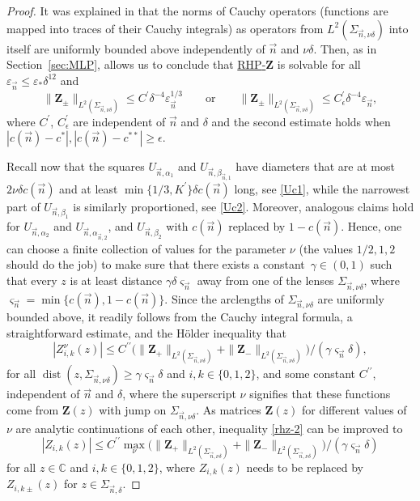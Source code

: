 \documentclass[pdftex]{sigma}
\numberwithin{equation}{section}
\newcommand{\C}		{\mathbb{C}}
\newcommand{\dist}{\operatorname{dist}}
\newcommand{\n}{{\vec n}}
\newcommand{\rhz} {\textnormal{RHP}-${\boldsymbol Z}$}
\begin{document}
\begin{proof}
It was explained in \cite[Lemma~7.9]{ApDenYa21} that the norms of Cauchy operators (functions are mapped into traces of their Cauchy integrals) as operators from $ L^2(\Sigma_{\n,\nu\delta}) $ into itself are uniformly bounded above independently of $ \n $ and $ \nu\delta $. Then, as in Section~\ref{sec:MLP}, \cite[Theorem~8.1]{FokasItsKapaevNovokshenov} allows us to conclude that \hyperref[rhz]{\rhz} is solvable for all $ \varepsilon_\n \leq \varepsilon_*\delta^{12} $ and
\begin{equation}
\label{rhz-4}
\|\boldsymbol Z_\pm\|_{L^2(\Sigma_{\n,\nu\delta})} \leq C^\prime \delta^{-4} \varepsilon_\n^{1/3} \qquad \text{or} \qquad \|\boldsymbol Z_\pm\|_{L^2(\Sigma_{\n,\nu\delta})} \leq C^\prime_\epsilon \delta^{-4}\varepsilon_\n,
\end{equation}
where $ C^\prime$, $C^\prime_\epsilon $ are independent of $ \n $ and $ \delta $ and the second estimate holds when $ |c(\n)-c^\ast|,|c(\n)-c^{\ast\ast}|\geq\epsilon $.

Recall now that the squares $ U_{\n,\alpha_1} $ and $ U_{\n,\beta_{\n,1}} $ have diameters that are at most $ 2\nu\delta c(\n) $ and at least $ \min\{1/3,K^\prime\}\delta c(\n)$ long, see \eqref{Uc1}, while the narrowest part of $ U_{\n,\beta_1} $ is similarly proportioned, see \eqref{Uc2}. Moreover, analogous claims hold for $ U_{\n,\alpha_2} $ and $ U_{\n,\alpha_{\n,2}} $, and $ U_{\n,\beta_2} $ with $ c(\n) $ replaced by $ 1-c(\n) $. Hence, one can choose a finite collection of values for the parameter $ \nu $ (the values $1/2,1,2$ should do the job) to make sure that there exists a constant~$ \gamma\in(0,1)$ such that every $ z $ is at least distance $ \gamma\delta \varsigma_\n $ away from one of the lenses $ \Sigma_{\n,\nu\delta} $, where~$ {\varsigma_\n = \min\{ c(\n),1-c(\n) \} }$. Since the arclengths of $ \Sigma_{\n,\nu\delta} $ are uniformly bounded above, it readily follows from the Cauchy integral formula, a straightforward estimate, and the H\"older inequality that
\begin{equation}
\label{rhz-2}
|Z_{i,k}^\nu(z)| \leq C^{\prime\prime} \bigl( \|\boldsymbol Z_+\|_{L^2(\Sigma_{\n,\nu\delta})} + \|\boldsymbol Z_-\|_{L^2(\Sigma_{\n,\nu\delta})} \bigr) / (\gamma \varsigma_\n\delta ),
\end{equation}
for all $ \dist(z,\Sigma_{\n,\nu\delta}) \geq \gamma\varsigma_\n\delta $ and $ i,k\in\{0,1,2\} $, and some constant $ C^{\prime\prime} $, independent of $ \n $ and $ \delta $, where the superscript $ \nu $ signifies that these functions come from $ \boldsymbol Z(z) $ with jump on $ \Sigma_{\n,\nu\delta} $. As matrices $ \boldsymbol{Z}(z) $ for different values of $ \nu $ are analytic continuations of each other, inequality \eqref{rhz-2} can be improved to
\begin{equation}
\label{rhz-3}
|Z_{i,k}(z)| \leq C^{\prime\prime} \max_\nu \bigl( \|\boldsymbol Z_+\|_{L^2(\Sigma_{\n,\nu\delta})} + \|\boldsymbol Z_-\|_{L^2(\Sigma_{\n,\nu\delta})} \bigr) / (\gamma \varsigma_\n\delta)
\end{equation}
for all $ z\in\C $ and $ i,k\in\{0,1,2\} $, where $ Z_{i,k}(z) $ needs to be replaced by $ Z_{i,k\pm}(z) $ for $ z\in\Sigma_{\n,\delta} $.


\end{proof}
\end{document}
